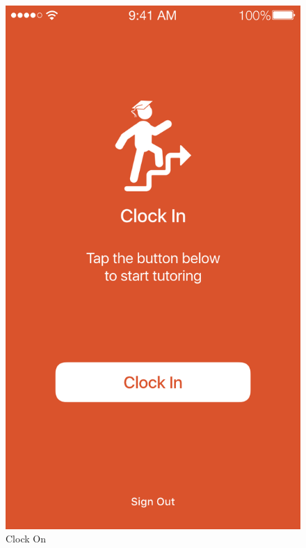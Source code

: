 \documentclass[a4paper,12pt]{article}
\begin{document}
\begin{figure}[p]
\centering
\includegraphics[scale=0.5]{e703e1125d.png}
\caption{Clock On}
\label{15}
\end{figure}
\end{document}
